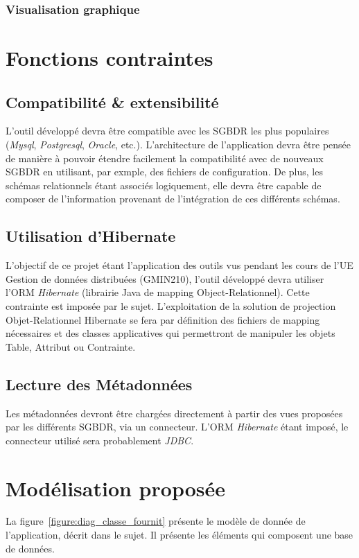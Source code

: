 		\subsubsection{Visualisation graphique}

\section{Fonctions contraintes}
	\subsection{Compatibilité \& extensibilité}
	L'outil développé devra être compatible avec les SGBDR les plus populaires (\emph{Mysql}, \emph{Postgresql}, \emph{Oracle}, etc.). L'architecture de l'application devra être pensée de manière à pouvoir étendre facilement la compatibilité avec de nouveaux SGBDR en utilisant, par exmple, des fichiers de configuration. De plus, les schémas relationnels étant associés logiquement, elle devra être capable de composer de l’information provenant de l’intégration de ces différents schémas.
	\subsection{Utilisation d'Hibernate}
	L'objectif de ce projet étant l'application des outils vus pendant les cours de l'UE Gestion de données distribuées (GMIN210), l'outil développé devra utiliser l'ORM \emph{Hibernate} (librairie Java de mapping Object-Relationnel). Cette contrainte est imposée par le sujet. L'exploitation de la solution de projection Objet-Relationnel Hibernate se fera par définition des fichiers de mapping nécessaires et des classes applicatives qui permettront de manipuler les objets Table, Attribut ou Contrainte.
	\subsection{Lecture des Métadonnées}
	Les métadonnées devront être chargées directement à partir des vues proposées par les différents SGBDR, via un connecteur. L'ORM \emph{Hibernate} étant imposé, le connecteur utilisé sera probablement \emph{JDBC}.

\section{Modélisation proposée}
\label{section:modelisation_proposee}

La figure~\ref{figure:diag_classe_fournit} présente le modèle de donnée de l'application, décrit dans le sujet. Il présente les éléments qui composent une base de données.

